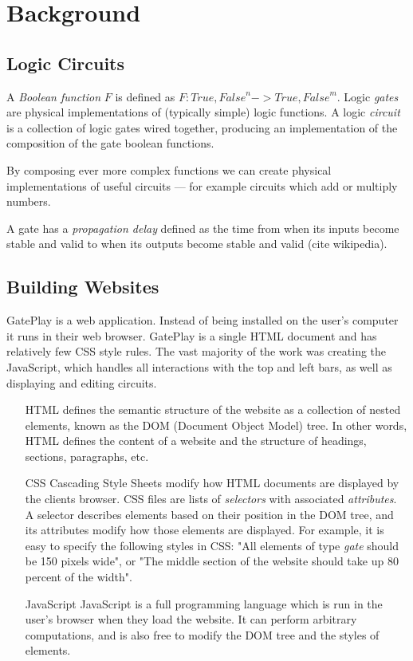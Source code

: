 \chapter{Background}
\label{chapter:background}

\section{Logic Circuits}
\label{sec:circuits}
A \textit{Boolean function} $F$ is defined as $F : {True, False}^n -> {True, False}^m$. Logic \textit{gates} are physical implementations of (typically simple) logic functions. A logic \textit{circuit} is a collection of logic gates wired together, producing an implementation of the composition of the gate boolean functions.

By composing ever more complex functions we can create physical implementations of useful circuits --- for example circuits which add or multiply numbers.

A gate has a \textit{propagation delay} defined as the time from when its inputs become stable and valid to when its outputs become stable and valid (cite wikipedia).

\section{Building Websites}
GatePlay is a web application. Instead of being installed on the user's computer it runs in their web browser. GatePlay is a single HTML document and has relatively few CSS style rules. The vast majority of the work was creating the JavaScript, which handles all interactions with the top and left bars, as well as displaying and editing circuits.

\begin{itemize}
	\item[HTML] defines the semantic structure of the website as a collection of nested elements, known as the DOM (Document Object Model) tree. In other words, HTML defines the content of a website and the structure of headings, sections, paragraphs, etc.
	
	\item[CSS] Cascading Style Sheets modify how HTML documents are displayed by the clients browser. CSS files are lists of \textit{selectors} with associated \textit{attributes}. A selector describes elements based on their position in the DOM tree, and its attributes modify how those elements are displayed. For example, it is easy to specify the following styles in CSS: "All elements of type \textit{gate} should be 150 pixels wide", or "The middle section of the website should take up 80 percent of the width".
	
	\item[JavaScript] JavaScript is a full programming language which is run in the user's browser when they load the website. It can perform arbitrary computations, and is also free to modify the DOM tree and the styles of elements.
\end{itemize}